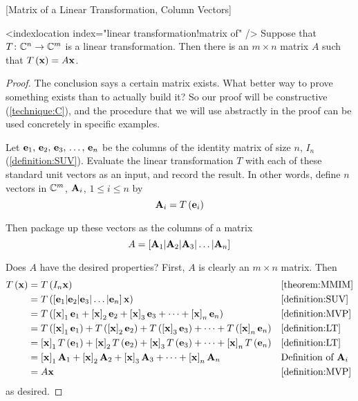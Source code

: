 \documentclass{ximera}
\begin{document}
\begin{theorem}
\label{theorem:MLTCV}
[Matrix of a Linear Transformation, Column Vectors]

<indexlocation index="linear transformation!matrix of" />
Suppose that $T\colon \mathbb{C}^{n}\rightarrow\mathbb{C}^{m}$ is a linear transformation.  Then there is an $m\times n$ matrix $A$ such that $T\left(\mathbf{x}\right)=A\mathbf{x}$.





\begin{proof}
The conclusion says a certain matrix exists.  What better way to prove something exists than to actually build it?  So our proof will be constructive (\ref{technique:C}), and the procedure that we will use abstractly in the proof can be used concretely in specific examples.



Let $\mathbf{e}_{1},\,\mathbf{e}_{2},\,\mathbf{e}_{3},\,\ldots,\,\mathbf{e}_{n}$ be the columns of the identity matrix of size $n$, $I_n$ (\ref{definition:SUV}).  Evaluate the linear transformation $T$ with each of these standard unit vectors as an input, and record the result.  In other words, define $n$ vectors in $\mathbb{C}^{m}$, $\mathbf{A}_i$, $1\leq i\leq n$ by
\[
\mathbf{A}_i=T\left(\mathbf{e}_i\right)
\]




Then package up these vectors as the columns of a matrix
\[
A=\left\lbrack\mathbf{A}_{1}|\mathbf{A}_{2}|\mathbf{A}_{3}|\ldots|\mathbf{A}_{n}\right\rbrack
\]




Does $A$ have the desired properties?  First, $A$ is clearly an $m\times n$ matrix.  Then
\begin{align*}
T\left(\mathbf{x}\right)
&=T\left(I_n\mathbf{x}\right)
&&\ref{theorem:MMIM}\\
&=T\left(\left\lbrack\mathbf{e}_{1}|\mathbf{e}_{2}|\mathbf{e}_{3}|\ldots|\mathbf{e}_{n}\right\rbrack\mathbf{x}\right)
&&\ref{definition:SUV}\\
&=T\left(
\left\lbrack\mathbf{x}\right\rbrack_{1}\mathbf{e}_1+
\left\lbrack\mathbf{x}\right\rbrack_{2}\mathbf{e}_2+
\left\lbrack\mathbf{x}\right\rbrack_{3}\mathbf{e}_3+
\cdots+
\left\lbrack\mathbf{x}\right\rbrack_{n}\mathbf{e}_n
\right)
&&\ref{definition:MVP}\\
&=
T\left(\left\lbrack\mathbf{x}\right\rbrack_{1}\mathbf{e}_1\right)+
T\left(\left\lbrack\mathbf{x}\right\rbrack_{2}\mathbf{e}_2\right)+
T\left(\left\lbrack\mathbf{x}\right\rbrack_{3}\mathbf{e}_3\right)+
\cdots+
T\left(\left\lbrack\mathbf{x}\right\rbrack_{n}\mathbf{e}_n\right)
&&\ref{definition:LT}\\
&=
\left\lbrack\mathbf{x}\right\rbrack_{1}T\left(\mathbf{e}_1\right)+
\left\lbrack\mathbf{x}\right\rbrack_{2}T\left(\mathbf{e}_2\right)+
\left\lbrack\mathbf{x}\right\rbrack_{3}T\left(\mathbf{e}_3\right)+
\cdots+
\left\lbrack\mathbf{x}\right\rbrack_{n}T\left(\mathbf{e}_n\right)
&&\ref{definition:LT}\\
&=
\left\lbrack\mathbf{x}\right\rbrack_{1}{\mathbf{A}_1}+
\left\lbrack\mathbf{x}\right\rbrack_{2}{\mathbf{A}_2}+
\left\lbrack\mathbf{x}\right\rbrack_{3}{\mathbf{A}_3}+
\cdots+
\left\lbrack\mathbf{x}\right\rbrack_{n}{\mathbf{A}_n}
&&\text{Definition of $\mathbf{A}_i$}\\
&=A\mathbf{x}
&&\ref{definition:MVP}
\end{align*}
as desired.



\end{proof}
\end{theorem}
\end{document}
